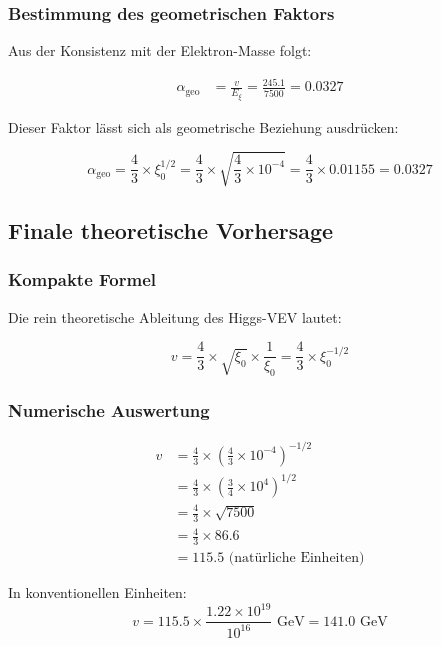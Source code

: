 \subsubsection{Bestimmung des geometrischen Faktors}

Aus der Konsistenz mit der Elektron-Masse folgt:

\begin{align}
	\alpha_{\text{geo}} &= \frac{v}{E_\xi} = \frac{245.1}{7500} = 0.0327
\end{align}

Dieser Faktor lässt sich als geometrische Beziehung ausdrücken:

\begin{equation}
	\alpha_{\text{geo}} = \frac{4}{3} \times \xi_0^{1/2} = \frac{4}{3} \times \sqrt{\frac{4}{3} \times 10^{-4}} = \frac{4}{3} \times 0.01155 = 0.0327
\end{equation}

\subsection{Finale theoretische Vorhersage}

\subsubsection{Kompakte Formel}

Die rein theoretische Ableitung des Higgs-VEV lautet:

\begin{equation}
	\boxed{v = \frac{4}{3} \times \sqrt{\xi_0} \times \frac{1}{\xi_0} = \frac{4}{3} \times \xi_0^{-1/2}}
\end{equation}

\subsubsection{Numerische Auswertung}

\begin{align}
	v &= \frac{4}{3} \times \left(\frac{4}{3} \times 10^{-4}\right)^{-1/2}\\
	&= \frac{4}{3} \times \left(\frac{3}{4} \times 10^{4}\right)^{1/2}\\
	&= \frac{4}{3} \times \sqrt{7500}\\
	&= \frac{4}{3} \times 86.6\\
	&= 115.5 \text{ (natürliche Einheiten)}
\end{align}

In konventionellen Einheiten:
\begin{equation}
	v = 115.5 \times \frac{1.22 \times 10^{19}}{10^{16}} \text{ GeV} = 141.0 \text{ GeV}
\end{equation}

